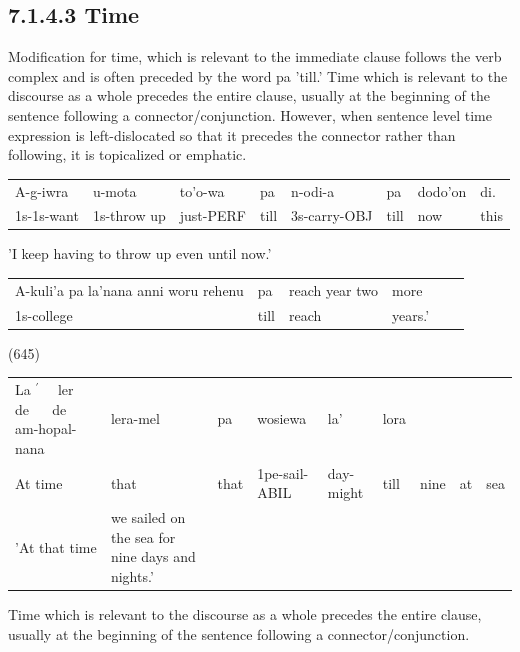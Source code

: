 \documentclass[10pt]{article}
\begin{document}
\subsection*{7.1.4.3 Time}
Modification for time, which is relevant to the immediate clause follows the verb complex and is often preceded by the word pa 'till.' Time which is relevant to the discourse as a whole precedes the entire clause, usually at the beginning of the sentence following a connector/conjunction. However, when sentence level time expression is left-dislocated so that it precedes the connector rather than following, it is topicalized or emphatic.

\begin{center}
\begin{tabular}{llllllll}
A-g-iwra & u-mota & to'o-wa & pa & n-odi-a & pa & dodo'on & di. \\
1s-1s-want & 1s-throw up & just-PERF & till & 3s-carry-OBJ & till & now & this \\
\end{tabular}
\end{center}

'I keep having to throw up even until now.'

\begin{center}
\begin{tabular}{llllll}
A-kuli'a pa la'nana anni woru rehenu & pa & reach year two & more &  \\
1s-college & till & reach & years.' &  \\
\end{tabular}
\end{center}

(645)

\begin{center}
\begin{tabular}{lllllllll}
La \(^{\prime} \quad\) ler \(\quad\) de \(\quad\) de \(\quad\) am-hopal-nana & lera-mel & pa & wosiewa & la' & lora &  &  &  \\
At time & that & that & 1pe-sail-ABIL & day-might & till & nine & at & sea \\
'At that time & we sailed on the sea for nine days and nights.' &  &  &  &  &  &  &  \\
\end{tabular}
\end{center}

Time which is relevant to the discourse as a whole precedes the entire clause, usually at the beginning of the sentence following a connector/conjunction.
\end{document}
